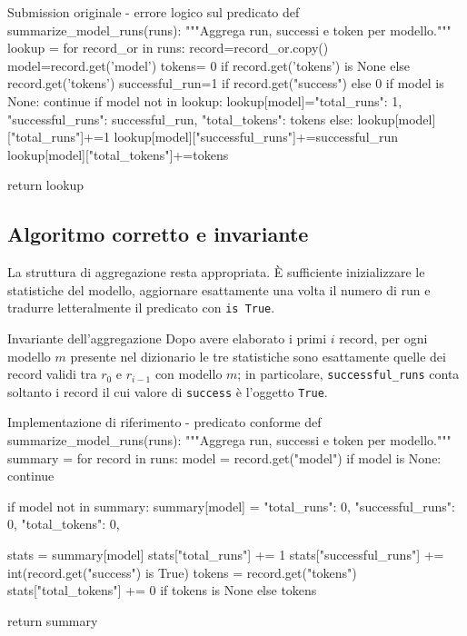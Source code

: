 \begin{inefficientcode}{Submission originale - errore logico sul predicato}
def summarize_model_runs(runs):
    """Aggrega run, successi e token per modello."""
    lookup = {}
    for record_or in runs:
        record=record_or.copy()
        model=record.get('model')
        tokens= 0 if record.get('tokens') is None else record.get('tokens')
        successful_run=1 if record.get("success") else 0
        if model is None:
            continue
        if model not in lookup:
            lookup[model]={"total_runs": 1, "successful_runs": successful_run, "total_tokens": tokens}
        else:
            lookup[model]["total_runs"]+=1
            lookup[model]["successful_runs"]+=successful_run
            lookup[model]["total_tokens"]+=tokens

    return lookup
\end{inefficientcode}

\subsection{Algoritmo corretto e invariante}

La struttura di aggregazione resta appropriata. È sufficiente inizializzare
le statistiche del modello, aggiornare esattamente una volta il numero di run
e tradurre letteralmente il predicato con \texttt{is True}.

\begin{principlebox}{Invariante dell'aggregazione}
Dopo avere elaborato i primi $i$ record, per ogni modello $m$ presente nel
dizionario le tre statistiche sono esattamente quelle dei record validi tra
$r_0$ e $r_{i-1}$ con modello $m$; in particolare,
\texttt{successful\_runs} conta soltanto i record il cui valore di
\texttt{success} è l'oggetto \texttt{True}.
\end{principlebox}

\begin{efficientcode}{Implementazione di riferimento - predicato conforme}
def summarize_model_runs(runs):
    """Aggrega run, successi e token per modello."""
    summary = {}
    for record in runs:
        model = record.get("model")
        if model is None:
            continue

        if model not in summary:
            summary[model] = {
                "total_runs": 0,
                "successful_runs": 0,
                "total_tokens": 0,
            }

        stats = summary[model]
        stats["total_runs"] += 1
        stats["successful_runs"] += int(record.get("success") is True)
        tokens = record.get("tokens")
        stats["total_tokens"] += 0 if tokens is None else tokens

    return summary
\end{efficientcode}

